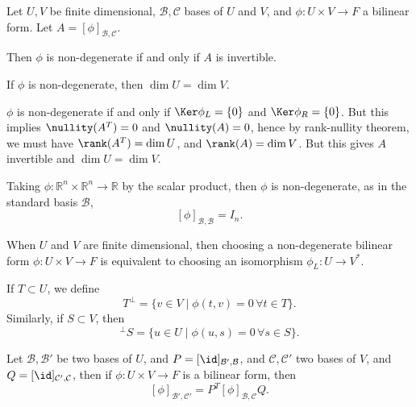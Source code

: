 \documentclass[12pt]{article}
\begin{document}
\begin{lemma}
	Let $U, V$ be finite dimensional, $\mathcal{B}, \mathcal{C}$ bases of $U$ and $V$, and $\phi: U \times V \to F$ a bilinear form. Let $A = [\phi]_{\mathcal{B}, \mathcal{C}}$.

	Then $\phi$ is non-degenerate if and only if $A$ is invertible.
\end{lemma}

\begin{corollary}
	If $\phi$ is non-degenerate, then $\dim U = \dim V$.
\end{corollary}

\begin{proofbox}
	$\phi$ is non-degenerate if and only if $\Ker \phi_L = \{0\}$ and $\Ker \phi_R = \{0\}$. But this implies $\nullity (A^{T}) = 0$ and $\nullity (A) = 0$, hence by rank-nullity theorem, we must have $\rank (A^{T}) = \dim U$, and $\rank (A) = \dim V$. But this gives $A$ invertible and $\dim U = \dim V$.
\end{proofbox}

\begin{remark}
	Taking $\phi : \mathbb{R}^{n} \times \mathbb{R}^{n} \to \mathbb{R}$ by the scalar product, then $\phi$ is non-degenerate, as in the standard basis $\mathcal{B}$,
	\[
		[\phi]_{\mathcal{B}, \mathcal{B}} = I_n
	.\]
\end{remark}

\begin{corollary}
	When $U$ and $V$ are finite dimensional, then choosing a non-degenerate bilinear form $\phi: U \times V \to F$ is equivalent to choosing an isomorphism $\phi_L : U \to V^{\ast}$.
\end{corollary}

\begin{definition}
	If $T \subset U$, we define
	\[
		T^{\perp} = \{v \in V \mid \phi(t, v) = 0 \, \forall t \in T\}
	.\]
	Similarly, if $S \subset V$, then
	\[
		^{\perp}S = \{u \in U \mid \phi(u, s) = 0 \, \forall s \in S\}
	.\]
\end{definition}

\begin{proposition}
	Let $\mathcal{B}, \mathcal{B}'$ be two bases of $U$, and $P = [\id]_{\mathcal{B}', \mathcal{B}}$, and $\mathcal{C}, \mathcal{C}'$ two bases of $V$, and $Q = [\id]_{\mathcal{C}', \mathcal{C}}$, then if $\phi: U \times V \to F$ is a bilinear form, then
	\[
		[\phi]_{\mathcal{B}', \mathcal{C}'} = P^{T} [\phi]_{\mathcal{B}, \mathcal{C}} Q
	.\]
\end{proposition}
\end{document}
